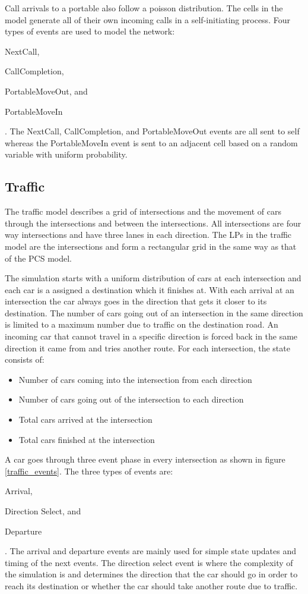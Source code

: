 \documentclass[11pt]{book}
\begin{document}
\noindent
Call arrivals to a portable also follow a poisson distribution. The cells in the model
generate all of their own incoming calls in a self-initiating process.
Four types of events are used to model the network: \begin{inparaenum}[(1)] \item NextCall,
\item CallCompletion, \item PortableMoveOut, and \item PortableMoveIn \end{inparaenum}.
The NextCall, CallCompletion, and PortableMoveOut events are all sent to self whereas
the PortableMoveIn event is sent to an adjacent cell based on a random variable with
uniform probability.

\subsection{Traffic}

The traffic model describes a grid of intersections and the movement of cars through
the intersections and between the intersections. All intersections are four way intersections
and have three lanes in each direction. The LPs in the traffic model are the intersections
and form a rectangular grid in the same way as that of the PCS model.

The simulation starts with a uniform distribution of cars at each intersection and each
car is a assigned a destination which it finishes at. With each arrival at an intersection
the car always goes in the direction that gets it closer to its destination.
The number of cars going out of an intersection in the same direction is limited to a
maximum number due to traffic on the destination road. An incoming car that cannot travel in
a specific direction is forced back in the same direction it came from and tries another
route. For each intersection, the state consists of:

\begin{itemize}
    \item Number of cars coming into the intersection from each direction
    \item Number of cars going out of the intersection to each direction
    \item Total cars arrived at the intersection
    \item Total cars finished at the intersection
\end{itemize}

A car goes through three event phase in every intersection as shown in figure
\ref{traffic_events}. The three types of events are: \begin{inparaenum}[(1)] \item Arrival,
\item Direction Select, and \item Departure \end{inparaenum}. The arrival and departure
events are mainly used for simple state updates and timing of the next events.
The direction select event is where the complexity of the simulation is and determines the
direction that the car should go in order to reach its destination or whether the car should
take another route due to traffic.
\end{document}
